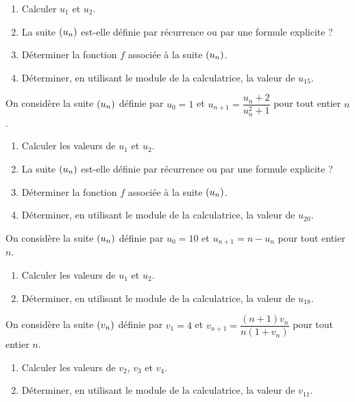\documentclass[a4paper,11pt]{article}
\begin{document}
\begin{enumerate}[itemsep=0pt]
	\item Calculer $u_1$ et $u_2$.
	\item La suite $\suiten$ est-elle définie par récurrence ou par une formule explicite ?
	\item Déterminer la fonction $f$ associée à la suite $\suiten$.
	\item Déterminer, en utilisant le module  de la calculatrice, la valeur de $u_{15}$.
\end{enumerate}

\medskip


\medskip

On considère la suite $\suiten$ définie par $u_0=1$ et $u_{n+1}=\dfrac{u_n+2}{u_n^2+1}$ pour tout entier $n$.

\begin{enumerate}[itemsep=0pt]
	\item Calculer les valeurs de $u_1$ et $u_2$.
	\item La suite $\suiten$ est-elle définie par récurrence ou par une formule explicite ?
	\item Déterminer la fonction $f$ associée à la suite $\suiten$.
	\item Déterminer, en utilisant le module  de la calculatrice, la valeur de $u_{20}$.
\end{enumerate}

\medskip


\medskip

On considère la suite $\suiten$ définie par $u_0=10$ et $u_{n+1}=n-u_n$ pour tout entier $n$.

\begin{enumerate}[itemsep=0pt]
	\item Calculer les valeurs de $u_1$ et $u_2$.
	\item Déterminer, en utilisant le module  de la calculatrice, la valeur de $u_{18}$.
\end{enumerate}

\medskip


\medskip

On considère la suite $\suiten[v]$ définie par $v_1=4$ et $v_{n+1}=\dfrac{(n+1)v_n}{n(1+v_n)}$ pour tout entier $n$.

\begin{enumerate}[itemsep=0pt]
	\item Calculer les valeurs de $v_2$, $v_3$ et $v_4$.
	\item Déterminer, en utilisant le module  de la calculatrice, la valeur de $v_{11}$.
\end{enumerate}
\end{document}
